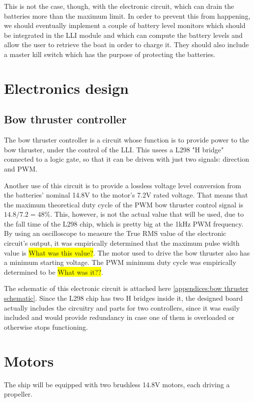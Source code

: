 	This is not the case, though, with the electronic circuit, which can drain the batteries more than the maximum limit. In order to prevent this from happening, we should eventually implement a couple of battery level monitors which should be integrated in the \ac{LLI} module and which can compute the battery levels and allow the user to retrieve the boat in order to charge it. They should also include a master kill switch which has the purpose of protecting the batteries.

\section{Electronics design}

	\subsection{Bow thruster controller}
	\label{subsec:bow thruster controller}
	
	The bow thruster controller is a circuit whose function is to provide power to the bow thruster, under the control of the \ac{LLI}. This usees a L298 "H bridge" connected to a logic gate, so that it can be driven with just two signals: direction and \ac{PWM}.
	
	Another use of this circuit is to provide a lossless voltage level conversion from the batteries' nominal 14.8V to the motor's 7.2V rated voltage. That means that the maximum theoretical duty cycle of the PWM bow thruster control signal is $ 14.8 / 7.2 = 48 \% $. This, however, is not the actual value that will be used, due to the fall time of the L298 chip, which is pretty big at the 1kHz PWM frequency. By using an oscilloscope to measure the True RMS value of the electronic circuit's output, it was empirically determined that the maximum pulse width value is \colorbox{yellow}{What was this value?}. 
	The motor used to drive the bow thruster also has a minimum starting voltage. The PWM minimum duty cycle was empirically determined to be \colorbox{yellow}{What was it??}.
	
	The schematic of this electronic circuit is attached here \ref{appendices:bow thruster schematic}. Since the L298 chip has two H bridges inside it, the designed board actually includes the circuitry and parts for two controllers, since it was easily included and would provide redundancy in case one of them is overloaded or otherwise stops functioning.
	
\section{Motors}

The ship will be equipped with two brushless 14.8V motors, each driving a propeller. 
